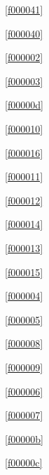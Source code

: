 ﻿



\noindent\filesourcenumbernameone\ \ref{f000041}\dotfill\pageref{f000041}%

\noindent\filesourcenumbernameone\ \ref{f000040}\dotfill\pageref{f000040}%

\noindent\filesourcenumbernameone\ \ref{f000002}\dotfill\pageref{f000002}%

\noindent\filesourcenumbernameone\ \ref{f000003}\dotfill\pageref{f000003}%

\noindent\filesourcenumbernameone\ \ref{f00000d}\dotfill\pageref{f00000d}%

\noindent\filesourcenumbernameone\ \ref{f000010}\dotfill\pageref{f000010}%

\noindent\filesourcenumbernameone\ \ref{f000016}\dotfill\pageref{f000016}%

\noindent\filesourcenumbernameone\ \ref{f000011}\dotfill\pageref{f000011}%

\noindent\filesourcenumbernameone\ \ref{f000012}\dotfill\pageref{f000012}%

\noindent\filesourcenumbernameone\ \ref{f000014}\dotfill\pageref{f000014}%

\noindent\filesourcenumbernameone\ \ref{f000013}\dotfill\pageref{f000013}%

\noindent\filesourcenumbernameone\ \ref{f000015}\dotfill\pageref{f000015}%

\noindent\filesourcenumbernameone\ \ref{f000004}\dotfill\pageref{f000004}%

\noindent\filesourcenumbernameone\ \ref{f000005}\dotfill\pageref{f000005}%

\noindent\filesourcenumbernameone\ \ref{f000008}\dotfill\pageref{f000008}%

\noindent\filesourcenumbernameone\ \ref{f000009}\dotfill\pageref{f000009}%

\noindent\filesourcenumbernameone\ \ref{f000006}\dotfill\pageref{f000006}%

\noindent\filesourcenumbernameone\ \ref{f000007}\dotfill\pageref{f000007}%

\noindent\filesourcenumbernameone\ \ref{f00000b}\dotfill\pageref{f00000b}%

\noindent\filesourcenumbernameone\ \ref{f00000c}\dotfill\pageref{f00000c}%

